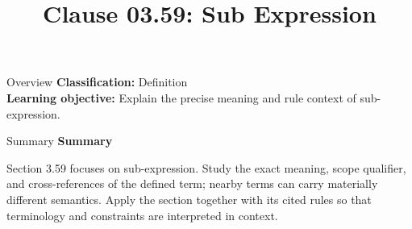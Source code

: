 \documentclass[10pt,letterpaper]{article}
\title{Clause 03.59: Sub Expression}
\author{}
\date{}
\begin{document}
\maketitle
\begin{CornellOverviewBox}{Overview}
\textbf{Classification:} Definition\\[2pt]
\textbf{Learning objective:} Explain the precise meaning and rule context of sub-expression.
\end{CornellOverviewBox}\begin{CornellSummaryBox}{Summary}
{\sffamily\bfseries\color{Accent} Summary}\par\vspace{3pt}Section 3.59 focuses on sub-expression. Study the exact meaning, scope qualifier, and cross-references of the defined term; nearby terms can carry materially different semantics. Apply the section together with its cited rules so that terminology and constraints are interpreted in context.
\end{CornellSummaryBox}
\end{document}
